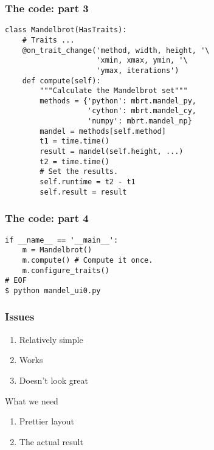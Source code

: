 \documentclass[14pt,compress]{beamer}
\newcounter{time}
\begin{document}
\begin{frame}
  \frametitle{The code: part 3}
\small
\begin{lstlisting}
class Mandelbrot(HasTraits):
    # Traits ...
    @on_trait_change('method, width, height, '\
                     'xmin, xmax, ymin, '\
                     'ymax, iterations')
    def compute(self):
        """Calculate the Mandelbrot set"""
        methods = {'python': mbrt.mandel_py, 
                   'cython': mbrt.mandel_cy,
                   'numpy': mbrt.mandel_np}
        mandel = methods[self.method]
        t1 = time.time()
        result = mandel(self.height, ...)
        t2 = time.time()
        # Set the results.
        self.runtime = t2 - t1
        self.result = result
  \end{lstlisting}
\end{frame}

\begin{frame}[fragile,plain]
  \frametitle{The code: part 4}
\small
\begin{lstlisting}
if __name__ == '__main__':
    m = Mandelbrot()
    m.compute() # Compute it once.
    m.configure_traits()
# EOF
$ python mandel_ui0.py
  \end{lstlisting}
  \begin{center}
  \end{center}
\end{frame}

\begin{frame}
    \frametitle{Issues}
    \begin{enumerate}
    \item Relatively simple
    \item Works
    \item Doesn't look great
    \end{enumerate}
    \begin{block}{What we need}
        \begin{enumerate}
            \item Prettier layout
            \item The actual result
        \end{enumerate}
    \end{block}
\end{frame}
\end{document}
